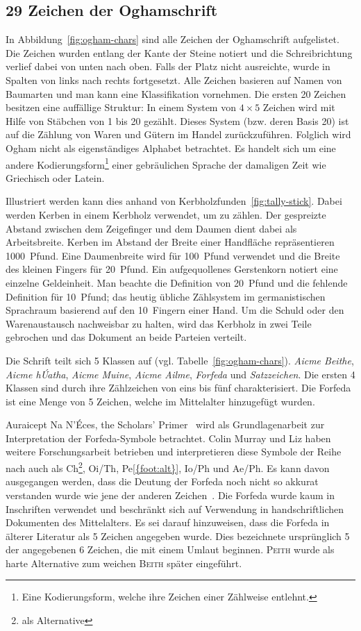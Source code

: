 \documentclass[a4paper]{scrartcl}
\newcommand{\character}[1]{\textsc{#1}}
\begin{document}
\subsection{29 Zeichen der Oghamschrift}
%
In Abbildung~\ref{fig:ogham-chars} sind alle Zeichen der Oghamschrift aufgelistet. Die Zeichen wurden entlang der Kante der Steine notiert und die Schreibrichtung verlief dabei von unten nach oben. Falls der Platz nicht ausreichte, wurde in Spalten von links nach rechts fortgesetzt. Alle Zeichen basieren auf Namen von Baumarten und man kann eine Klassifikation vornehmen. Die ersten 20 Zeichen besitzen eine auffällige Struktur: In einem System von $4\times 5$ Zeichen wird mit Hilfe von Stäbchen von 1 bis 20 gezählt. Dieses System (bzw. deren Basis 20) ist auf die Zählung von Waren und Gütern im Handel zurückzuführen. Folglich wird Ogham nicht als eigenständiges Alphabet betrachtet. Es handelt sich um eine andere Kodierungsform\footnote{Eine Kodierungsform, welche ihre Zeichen einer Zählweise entlehnt.} einer gebräulichen Sprache der damaligen Zeit wie Griechisch oder Latein. 

Illustriert werden kann dies anhand von Kerbholzfunden~\ref{fig:tally-stick}. Dabei werden Kerben in einem Kerbholz verwendet, um zu zählen. Der gespreizte Abstand zwischen dem Zeigefinger und dem Daumen dient dabei als Arbeitsbreite. Kerben im Abstand der Breite einer Handfläche repräsentieren 1000~Pfund. Eine Daumenbreite wird für 100~Pfund verwendet und die Breite des kleinen Fingers für 20~Pfund. Ein aufgequollenes Gerstenkorn notiert eine einzelne Geldeinheit. Man beachte die Definition von 20~Pfund und die fehlende Definition für 10~Pfund; das heutig übliche Zählsystem im germanistischen Sprachraum basierend auf den 10~Fingern einer Hand. Um die Schuld oder den Warenaustausch nachweisbar zu halten, wird das Kerbholz in zwei Teile gebrochen und das \glqq Dokument\grqq{} an beide Parteien verteilt.

Die Schrift teilt sich 5 Klassen auf (vgl. Tabelle~\ref{fig:ogham-chars}). \emph{Aicme Beithe}, \emph{Aicme hÚatha}, \emph{Aicme Muine}, \emph{Aicme Ailme}, \emph{Forfeda} und \emph{Satzzeichen}. Die ersten 4 Klassen sind durch ihre Zählzeichen von eins bis fünf charakterisiert. Die Forfeda ist eine Menge von 5 Zeichen, welche im Mittelalter hinzugefügt wurden.

\glqq Auraicept Na N'{\'E}ces, the Scholars' Primer\grqq{}~\cite{auraicept1917} wird als Grundlagenarbeit zur Interpretation der Forfeda-Symbole betrachtet. Colin Murray und Liz haben weitere Forschungsarbeit betrieben und interpretieren diese Symbole der Reihe nach auch als Ch\footnote{\label{foot:alt}als Alternative}, Oi/Th, Pe\cref{{foot:alt}}, Io/Ph und Ae/Ph. Es kann davon ausgegangen werden, dass die Deutung der Forfeda noch nicht so akkurat verstanden wurde wie jene der anderen Zeichen~\cite{forfeda-intro}. Die Forfeda wurde kaum in Inschriften verwendet und beschränkt sich auf Verwendung in handschriftlichen Dokumenten des Mittelalters. Es sei darauf hinzuweisen, dass die Forfeda in älterer Literatur als 5 Zeichen angegeben wurde. Dies bezeichnete ursprünglich 5 der angegebenen 6 Zeichen, die mit einem Umlaut beginnen. \character{Peith} wurde als harte Alternative zum weichen \character{Beith} später eingeführt.
\end{document}
